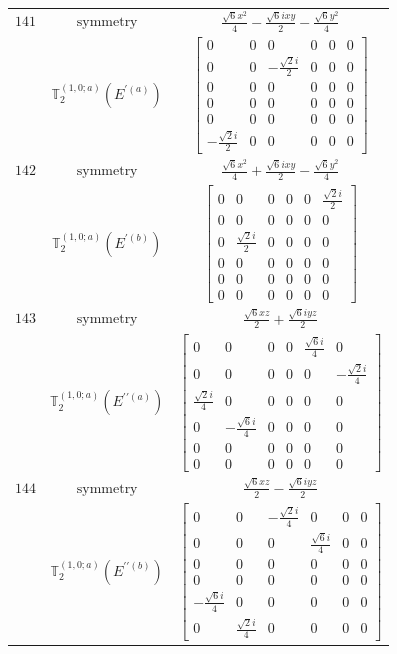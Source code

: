 \documentclass[fleqn,8pt,landscape]{jsarticle}
\begin{document}
\begin{longtable}{ccc}
$ 141 $ & $ \text{symmetry} $ & $ \frac{\sqrt{6} x^{2}}{4} - \frac{\sqrt{6} i x y}{2} - \frac{\sqrt{6} y^{2}}{4} $ \\
$  $ & $ \mathbb{T}_{2}^{(1,0;a)}(E^{\prime(a)}) $ & $ \begin{bmatrix} 0 & 0 & 0 & 0 & 0 & 0 \\ 0 & 0 & - \frac{\sqrt{2} i}{2} & 0 & 0 & 0 \\ 0 & 0 & 0 & 0 & 0 & 0 \\ 0 & 0 & 0 & 0 & 0 & 0 \\ 0 & 0 & 0 & 0 & 0 & 0 \\ - \frac{\sqrt{2} i}{2} & 0 & 0 & 0 & 0 & 0 \end{bmatrix} $ \\ \hline
$ 142 $ & $ \text{symmetry} $ & $ \frac{\sqrt{6} x^{2}}{4} + \frac{\sqrt{6} i x y}{2} - \frac{\sqrt{6} y^{2}}{4} $ \\
$  $ & $ \mathbb{T}_{2}^{(1,0;a)}(E^{\prime(b)}) $ & $ \begin{bmatrix} 0 & 0 & 0 & 0 & 0 & \frac{\sqrt{2} i}{2} \\ 0 & 0 & 0 & 0 & 0 & 0 \\ 0 & \frac{\sqrt{2} i}{2} & 0 & 0 & 0 & 0 \\ 0 & 0 & 0 & 0 & 0 & 0 \\ 0 & 0 & 0 & 0 & 0 & 0 \\ 0 & 0 & 0 & 0 & 0 & 0 \end{bmatrix} $ \\ \hline
$ 143 $ & $ \text{symmetry} $ & $ \frac{\sqrt{6} x z}{2} + \frac{\sqrt{6} i y z}{2} $ \\
$  $ & $ \mathbb{T}_{2}^{(1,0;a)}(E^{\prime\prime(a)}) $ & $ \begin{bmatrix} 0 & 0 & 0 & 0 & \frac{\sqrt{6} i}{4} & 0 \\ 0 & 0 & 0 & 0 & 0 & - \frac{\sqrt{2} i}{4} \\ \frac{\sqrt{2} i}{4} & 0 & 0 & 0 & 0 & 0 \\ 0 & - \frac{\sqrt{6} i}{4} & 0 & 0 & 0 & 0 \\ 0 & 0 & 0 & 0 & 0 & 0 \\ 0 & 0 & 0 & 0 & 0 & 0 \end{bmatrix} $ \\ \hline
$ 144 $ & $ \text{symmetry} $ & $ \frac{\sqrt{6} x z}{2} - \frac{\sqrt{6} i y z}{2} $ \\
$  $ & $ \mathbb{T}_{2}^{(1,0;a)}(E^{\prime\prime(b)}) $ & $ \begin{bmatrix} 0 & 0 & - \frac{\sqrt{2} i}{4} & 0 & 0 & 0 \\ 0 & 0 & 0 & \frac{\sqrt{6} i}{4} & 0 & 0 \\ 0 & 0 & 0 & 0 & 0 & 0 \\ 0 & 0 & 0 & 0 & 0 & 0 \\ - \frac{\sqrt{6} i}{4} & 0 & 0 & 0 & 0 & 0 \\ 0 & \frac{\sqrt{2} i}{4} & 0 & 0 & 0 & 0 \end{bmatrix} $ \\ \hline

\end{longtable}
\end{document}
